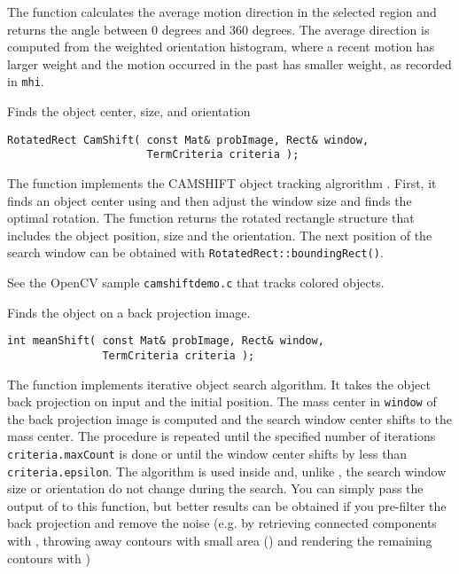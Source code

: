 The function calculates the average
motion direction in the selected region and returns the angle between
0 degrees  and 360 degrees. The average direction is computed from
the weighted orientation histogram, where a recent motion has larger
weight and the motion occurred in the past has smaller weight, as recorded in \texttt{mhi}.

Finds the object center, size, and orientation

\begin{lstlisting}
RotatedRect CamShift( const Mat& probImage, Rect& window,
                      TermCriteria criteria );
\end{lstlisting}
\begin{description}
\end{description}

The function implements the CAMSHIFT object tracking algrorithm
.
First, it finds an object center using  and then adjust the window size and finds the optimal rotation. The function returns the rotated rectangle structure that includes the object position, size and the orientation. The next position of the search window can be obtained with \texttt{RotatedRect::boundingRect()}.

See the OpenCV sample \texttt{camshiftdemo.c} that tracks colored objects.

Finds the object on a back projection image.

\begin{lstlisting}
int meanShift( const Mat& probImage, Rect& window,
               TermCriteria criteria );
\end{lstlisting}
\begin{description}
\end{description}

The function implements iterative object search algorithm. It takes the object back projection on input and the initial position. The mass center in \texttt{window} of the back projection image is computed and the search window center shifts to the mass center. The procedure is repeated until the specified number of iterations \texttt{criteria.maxCount} is done or until the window center shifts by less than \texttt{criteria.epsilon}. The algorithm is used inside  and, unlike , the search window size or orientation do not change during the search. You can simply pass the output of  to this function, but better results can be obtained if you pre-filter the back projection and remove the noise (e.g. by retrieving connected components with , throwing away contours with small area () and rendering the  remaining contours with )


